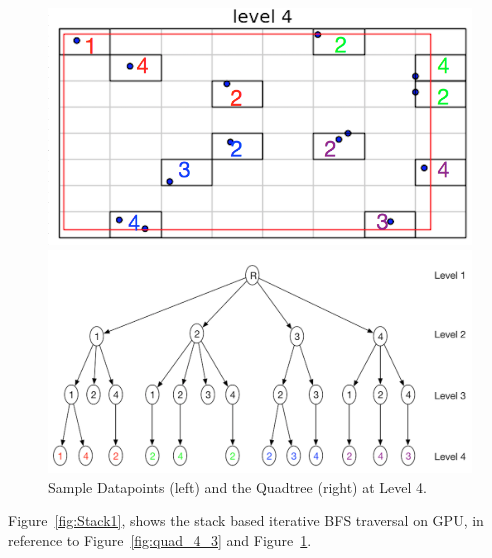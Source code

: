 \begin{figure}[H]
  \centering
  \vspace{0.5in}
  \begin{minipage}[b]{0.35\textwidth}
    \includegraphics[width=\textwidth]{Images/4Quad1_4}
  \end{minipage}
  \hfill
  \begin{minipage}[b]{0.6\textwidth}
    \includegraphics[width=\textwidth]{Images/1_1Quad_4_tree}
  \end{minipage}
  \vspace{0.5in}
  \caption{Sample Datapoints (left) and the Quadtree (right) at Level 4.}
  \label{fig:4Quad1_4}
\end{figure}

Figure~\ref{fig:Stack1}, shows the stack based iterative BFS traversal on GPU, in reference to Figure~\ref{fig:quad_4_3} 
and Figure~\ref{fig:4Quad1_4}. 

